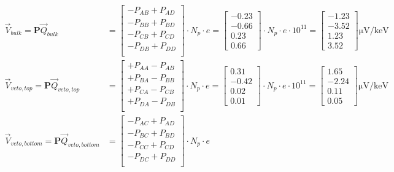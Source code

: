 \begin{align}
\label{eq:fid38-sensitivity}
\vec{V}_{bulk} = \bm{P} \vec{Q}_{bulk} &=
\begin{bmatrix}
- P_{AB} + P_{AD} \\
- P_{BB} + P_{BD} \\
- P_{CB} + P_{CD} \\
- P_{DB} + P_{DD} \\
\end{bmatrix}
\cdot N_p \cdot e
= 
\begin{bmatrix}
-0.23 \\ -0.66 \\ 0.23 \\ 0.66
\end{bmatrix}
\cdot N_p \cdot e \cdot 10^{11}
=
\begin{bmatrix}
-1.23 \\ -3.52 \\ 1.23 \\ 3.52
\end{bmatrix}
\si{\micro\volt\per\kilo\eV}
\\
\vec{V}_{veto, top} = \bm{P} \vec{Q}_{veto,top} &=
\begin{bmatrix}
+ P_{AA} - P_{AB} \\
+ P_{BA} - P_{BB} \\
+ P_{CA} - P_{CB} \\
+ P_{DA} - P_{DB} \\
\end{bmatrix}
\cdot N_p \cdot e
= 
\begin{bmatrix}
0.31 \\ -0.42 \\ 0.02 \\ 0.01
\end{bmatrix}
\cdot N_p \cdot e \cdot 10^{11}
= 
\begin{bmatrix}
1.65 \\ -2.24 \\ 0.11 \\ 0.05
\end{bmatrix}
\si{\micro\volt\per\kilo\eV}
\\
\vec{V}_{veto,bottom} = \bm{P} \vec{Q}_{veto,bottom} &=
\begin{bmatrix}
- P_{AC} + P_{AD} \\
- P_{BC} + P_{BD} \\
- P_{CC} + P_{CD} \\
- P_{DC} + P_{DD} \\
\end{bmatrix}
\cdot N_p \cdot e

\end{align}
